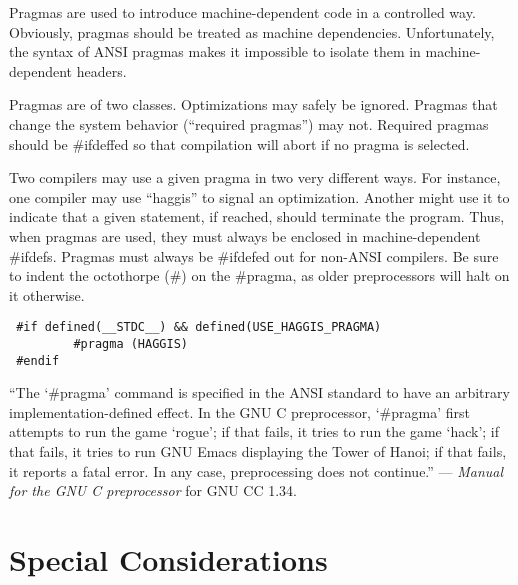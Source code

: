 Pragmas are used to introduce machine-dependent code in a controlled way.
Obviously, pragmas should be treated as machine dependencies. Unfortunately,
the syntax of ANSI pragmas makes it impossible to isolate them in
machine-dependent headers. 

Pragmas are of two classes. Optimizations may safely be ignored. Pragmas that
change the system behavior (``required pragmas'') may not. Required pragmas
should be \#ifdeffed so that compilation will abort if no pragma is selected. 

 Two compilers may use a given pragma in two very different ways. For instance,
one compiler may use ``haggis'' to signal an optimization. Another might use it
to indicate that a given statement, if reached, should terminate the program.
Thus, when pragmas are used, they must always be enclosed in machine-dependent
\#ifdefs. Pragmas must always be \#ifdefed out for non-ANSI compilers. Be sure
to indent the octothorpe (\#) on the \#pragma, as older preprocessors will halt
on it otherwise. 
\begin{verbatim}
 #if defined(__STDC__) && defined(USE_HAGGIS_PRAGMA)
         #pragma (HAGGIS)
 #endif
\end{verbatim}

``The `\#pragma' command is specified in the ANSI standard to have an arbitrary
implementation-defined effect. In the GNU C preprocessor, `\#pragma' first
attempts to run the game `rogue'; if that fails, it tries to run the game
`hack'; if that fails, it tries to run GNU Emacs displaying the Tower of
Hanoi; if that fails, it reports a fatal error. In any case, preprocessing
does not continue.'' --- {\em Manual for the GNU C preprocessor}
for GNU CC 1.34.
\newpage
\section{Special Considerations}

